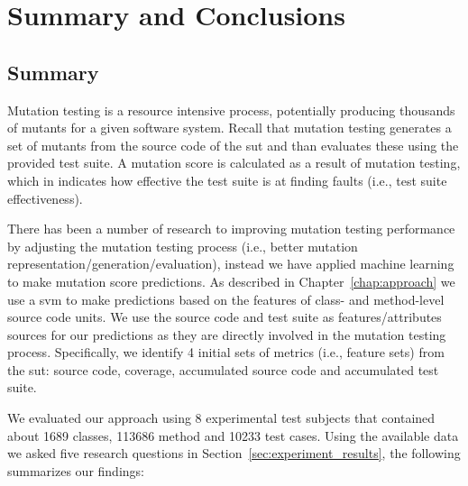 \chapter{Summary and Conclusions}
\label{chap:conclusions}


\section{Summary}
\label{sec:conclusions_summary}
Mutation testing is a resource intensive process, potentially producing thousands of mutants for a given software system. Recall that mutation testing generates a set of mutants from the source code of the \gls{sut} and than evaluates these using the provided test suite. A mutation score is calculated as a result of mutation testing, which in indicates how effective the test suite is at finding faults (i.e., test suite effectiveness).

There has been a number of research to improving mutation testing performance by adjusting the mutation testing process (i.e., better mutation representation/generation/evaluation), instead we have applied machine learning to make mutation score predictions. As described in Chapter~\ref{chap:approach} we use a \gls{svm} to make predictions based on the features of class- and method-level source code units. We use the source code and test suite as features/attributes sources for our predictions as they are directly involved in the mutation testing process. Specifically, we identify 4 initial sets of metrics (i.e., feature sets) from the \gls{sut}: source code, coverage, accumulated source code and accumulated test suite.

We evaluated our approach using 8 experimental test subjects that contained about 1689 classes, 113686 method and 10233 test cases. Using the available data we asked five research questions in Section~\ref{sec:experiment_results}, the following summarizes our findings:


